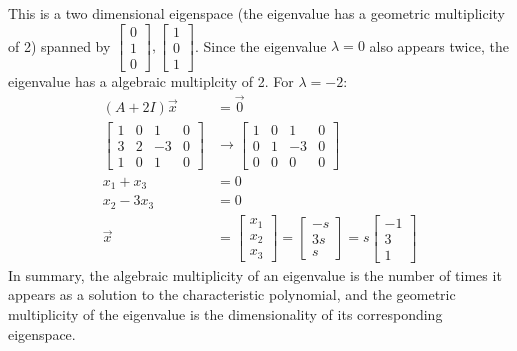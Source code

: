\documentclass{math}
\begin{document}
This is a two dimensional eigenspace (the eigenvalue has a geometric
multiplicity of 2) spanned by \( \begin{bmatrix}0 \\ 1 \\ 0\end{bmatrix},
\begin{bmatrix}1 \\ 0 \\ 1\end{bmatrix} \). Since the eigenvalue
\( \lambda = 0 \) also appears twice, the eigenvalue has a algebraic
multiplcity of 2. For \( \lambda = -2 \):
\begin{align*}
  (A+2I)\vec{x} &= \vec{0} \\
  \begin{bmatrix}
    1 & 0 & 1 & 0 \\
    3 & 2 & -3 & 0 \\
    1 & 0 & 1 & 0
  \end{bmatrix} &\to \begin{bmatrix}
    1 & 0 & 1 & 0 \\
    0 & 1 & -3 & 0 \\
    0 & 0 & 0 & 0
  \end{bmatrix} \\
  x_1+x_3 &= 0 \\
  x_2-3x_3 &= 0 \\
  \vec{x} &= \begin{bmatrix}
    x_1 \\ x_2 \\ x_3
  \end{bmatrix} = \begin{bmatrix}
    -s \\ 3s \\ s
  \end{bmatrix} = s\begin{bmatrix}
    -1 \\ 3 \\ 1
  \end{bmatrix}
\end{align*}
In summary, the algebraic multiplicity of an eigenvalue is the number of times
it appears as a solution to the characteristic polynomial, and the geometric
multiplicity of the eigenvalue is the dimensionality of its corresponding
eigenspace.
\end{document}
